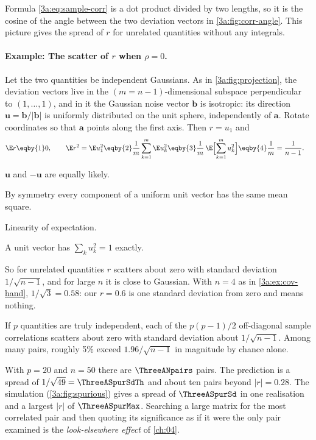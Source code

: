 Formula \eqref{3a:eq:sample-corr} is a dot product divided by two lengths,
so it is the cosine of the angle between the two deviation vectors in
\cref{3a:fig:corr-angle}. This picture gives the spread of $r$ for unrelated
quantities without any integrals.

\paragraph{Example: The scatter of $r$ when $\rho=0$.}
\label{3a:ex:r-null}
Let the two quantities be independent Gaussians. As in
\cref{3a:fig:projection}, the deviation vectors live in the
$(m=n-1)$-dimensional subspace perpendicular to $(1,\dots,1)$, and in it the
Gaussian noise vector $\bm b$ is isotropic: its direction $\bm u=\bm b/|\bm b|$ is
uniformly distributed on the unit sphere, independently of $\bm a$. Rotate
coordinates so that $\bm a$ points along the first axis. Then $r=u_1$ and
\begin{align*}
  \E r \eqby{1} 0,\qquad
  \E r^2=\E u_1^2
  &\eqby{2} \frac1m\sum_{k=1}^m\E u_k^2
   \eqby{3} \frac1m\,\E\Bigl[\sum_{k=1}^mu_k^2\Bigr]
   \eqby{4} \frac1m=\frac{1}{n-1} .
\end{align*}
\begin{explain}
  \item $\bm u$ and $-\bm u$ are equally likely.
  \item By symmetry every component of a uniform unit vector has the same
        mean square.
  \item Linearity of expectation.
  \item A unit vector has $\sum_ku_k^2=1$ exactly.
\end{explain}
So for unrelated quantities $r$ scatters about zero with standard deviation
$1/\sqrt{n-1}$, and for large $n$ it is close to Gaussian. With $n=4$ as in
\cref{3a:ex:cov-hand}, $1/\sqrt3=0.58$: our $r=0.6$ is one standard deviation
from zero and means nothing.

\begin{keyidea}
If $p$ quantities are truly independent, each of the $p(p-1)/2$ off-diagonal
sample correlations scatters about zero with standard deviation about
$1/\sqrt{n-1}$. Among many pairs, roughly 5\% exceed $1.96/\sqrt{n-1}$ in
magnitude by chance alone.
\end{keyidea}

With $p=20$ and $n=50$ there are $\ThreeANpairs$ pairs. The prediction is a
spread of $1/\sqrt{49}=\ThreeASpurSdTh$ and about ten pairs beyond
$|r|=0.28$. The simulation (\cref{3a:fig:spurious}) gives a spread of
$\ThreeASpurSd$ in one realisation and a largest $|r|$ of $\ThreeASpurMax$.
Searching a large matrix for the most correlated pair and then quoting its
significance as if it were the only pair examined is the \emph{look-elsewhere
effect} of \cref{ch:04}.

